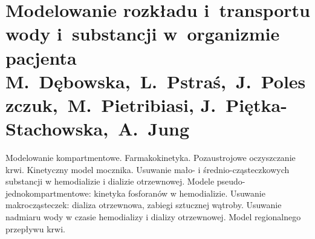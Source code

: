 \chapter[Modelowanie rozkładu i~transportu wody i~substancji w~organizmie pacjenta]{Modelowanie rozkładu i~transportu wody i~substancji w~organizmie pacjenta\\{\large M.~Dębowska,~L.~Pstraś,~J.~Poleszczuk,~M.~Pietribiasi, J.~\mbox{Piętka-Stachowska},~A.~Jung}}

Modelowanie kompartmentowe. Farmakokinetyka. Pozaustrojowe oczyszczanie krwi. Kinetyczny model mocznika. Usuwanie mało- i średnio-cząsteczkowych substancji w hemodializie i dializie otrzewnowej. Modele pseudo-jednokompartmentowe: kinetyka fosforanów w hemodializie. Usuwanie makrocząsteczek: dializa otrzewnowa, zabiegi sztucznej wątroby. Usuwanie nadmiaru wody w czasie hemodializy i dializy otrzewnowej. Model regionalnego przepływu krwi. 